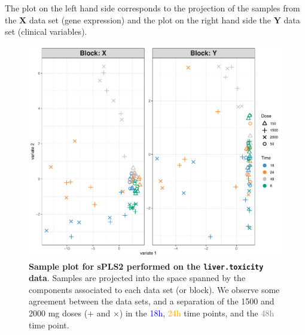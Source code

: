 \documentclass[
]{book}
\newenvironment{Shaded}{\begin{snugshade}}{\end{snugshade}}
\newcommand{\AttributeTok}[1]{\textcolor[rgb]{0.77,0.63,0.00}{#1}}
\newcommand{\ConstantTok}[1]{\textcolor[rgb]{0.00,0.00,0.00}{#1}}
\newcommand{\DecValTok}[1]{\textcolor[rgb]{0.00,0.00,0.81}{#1}}
\newcommand{\FunctionTok}[1]{\textcolor[rgb]{0.00,0.00,0.00}{#1}}
\newcommand{\NormalTok}[1]{#1}
\newcommand{\SpecialCharTok}[1]{\textcolor[rgb]{0.00,0.00,0.00}{#1}}
\newcommand{\StringTok}[1]{\textcolor[rgb]{0.31,0.60,0.02}{#1}}
\begin{document}
The plot on the left hand side corresponds to the projection of the samples from the \(\boldsymbol X\) data set (gene expression) and the plot on the right hand side the \(\boldsymbol Y\) data set (clinical variables).

\begin{Shaded}
\end{Shaded}

\begin{figure}

{\centering \includegraphics[width=0.7\linewidth]{Figures/PLS/04-spls2-sample-plot-1} 

}

\caption{\textbf{Sample plot for sPLS2 performed on the \texttt{liver.toxicity} data}. Samples are projected into the space spanned by the components associated to each data set (or block). We observe some agreement between the data sets, and a separation of the 1500 and 2000 mg doses (\(+\) and \(\times\)) in the \textcolor{blue}{18h}, \textcolor{orange}{24h} time points, and the \textcolor{grey}{48h} time point.}\label{fig:04-spls2-sample-plot}
\end{figure}
\end{document}
